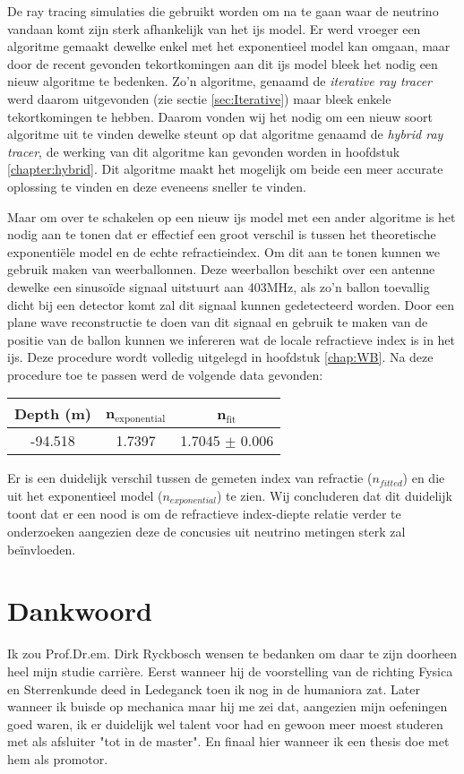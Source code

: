 De ray tracing simulaties die gebruikt worden om na te gaan waar de neutrino
vandaan komt zijn sterk afhankelijk van het ijs model.  Er werd vroeger een
algoritme gemaakt dewelke enkel met het exponentieel model kan omgaan, maar
door de recent gevonden tekortkomingen aan dit ijs model bleek het nodig een
nieuw algoritme te bedenken. Zo'n algoritme, genaamd de \textit{iterative ray
tracer} werd daarom uitgevonden (zie sectie \ref{sec:Iterative}) maar bleek
enkele tekortkomingen te hebben. Daarom vonden wij het nodig om een nieuw soort
algoritme uit te vinden dewelke steunt op dat algoritme genaamd de
\textit{hybrid ray tracer}, de werking van dit algoritme kan gevonden worden in
hoofdstuk \ref{chapter:hybrid}. Dit algoritme maakt het mogelijk om beide een
meer accurate oplossing te vinden en deze eveneens sneller te vinden.

Maar om over te schakelen op een nieuw ijs model met een ander algoritme is het nodig aan te tonen dat er effectief
een groot verschil is tussen het theoretische exponentiële model en de echte refractieindex. Om dit aan te tonen 
kunnen we gebruik maken van weerballonnen. 
Deze weerballon beschikt over een antenne dewelke een sinusoïde signaal uitstuurt aan 403MHz, als zo'n ballon toevallig
dicht bij een detector komt zal dit signaal kunnen gedetecteerd worden. Door een plane wave reconstructie te doen
van dit signaal en gebruik te maken van de positie van de ballon kunnen we infereren wat de locale refractieve index
is in het ijs. Deze procedure wordt volledig uitgelegd in hoofdstuk \ref{chap:WB}.
Na deze procedure toe te passen werd de volgende data gevonden:
\begin{center}
\begin{tabular}{||c c c||}
 \hline
 Depth (m) & n$_\text{exponential}$ & n$_\text{fit}$\\ [0.5ex]
 \hline\hline
 -94.518 & 1.7397 & 1.7045 $\pm$ 0.006 \\
 \hline
\end{tabular}
\end{center}
Er is een duidelijk verschil tussen de gemeten index van refractie
($n_{fitted}$) en die uit het exponentieel model ($n_{exponential}$) te zien.
Wij concluderen dat dit duidelijk toont dat er een nood is om de refractieve
index-diepte relatie verder te onderzoeken aangezien deze de concusies uit
neutrino metingen sterk zal beïnvloeden.
\newpage
\chapter*{Dankwoord}
Ik zou Prof.Dr.em. Dirk Ryckbosch wensen te bedanken om daar te zijn doorheen
heel mijn studie carrière. Eerst wanneer hij de voorstelling van de richting
Fysica en Sterrenkunde deed in Ledeganck toen ik nog in de humaniora zat. Later wanneer ik buisde op
mechanica maar hij me zei dat, aangezien mijn oefeningen goed waren, ik er
duidelijk wel talent voor had en gewoon meer moest studeren met als afsluiter
"tot in de master". En finaal hier wanneer ik een thesis doe met hem als
promotor.

